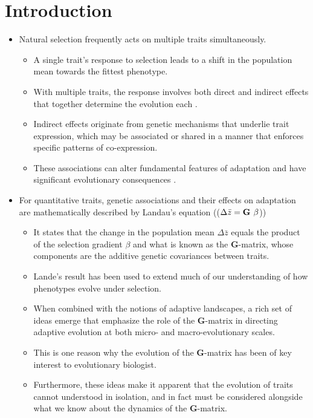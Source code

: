 \documentclass[11pt,one column]{article}
\begin{document}
\section*{Introduction}
\begin{itemize}
\item Natural selection frequently acts on multiple traits simultaneously. 
\begin{itemize}
\item A single trait's response to selection leads to a shift in the population mean towards the fittest phenotype.
\item With multiple traits, the response involves both direct and indirect effects that together determine the evolution each \cite{Scarcelli23102007,Lovell2013,Wagner2011}.  
\item Indirect effects originate from genetic mechanisms that underlie trait expression, which may be associated or shared in a manner that enforces specific patterns of co-expression.
\item These associations can alter fundamental features of adaptation and have significant evolutionary consequences \cite{Felsenstein1979, Arnold2001, Arnold2008}.
\end{itemize}

\item For quantitative traits, genetic associations and their effects on adaptation are mathematically described by Landau's equation (($\Delta \bar{z} = \textbf{G} \hspace{.05in}\beta$))
\begin{itemize}	
\item It states that the change in the population mean $\Delta \bar{z}$ equals the product of the selection gradient $\beta$ and what is known as the \textbf{G}-matrix, whose components are the additive genetic covariances between traits.
\item Lande’s result has been used to extend much of our understanding of how phenotypes evolve under selection. 
\item When combined with the notions of adaptive landscapes, a rich set of ideas emerge that emphasize the role of the \textbf{G}-matrix in directing adaptive evolution at both micro- and macro-evolutionary scales.
\item This is one reason why the evolution of the \textbf{G}-matrix has been of key interest to evolutionary biologist. 
\item Furthermore, these ideas make it apparent that the evolution of traits cannot understood in isolation, and in fact must be considered alongside what we know about the dynamics of the \textbf{G}-matrix.
\end{itemize}


\end{itemize}
\end{document}
